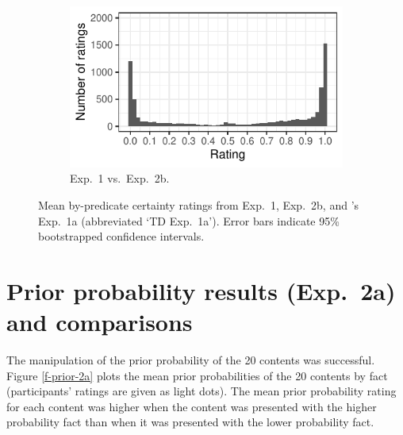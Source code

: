 \documentclass[11pt,fleqn]{article}
\newcommand{\6}{\mbox{$[\hspace*{-.6mm}[$}}
\newcommand{\9}{\mbox{$]\hspace*{-.6mm}]$}}
\newcommand{\citepos}[1]{\citeauthor{#1}'s \citeyear{#1}}
\begin{document}
\begin{figure}[h!]
\begin{subfigure}{.33\textwidth}
\includegraphics[width=\textwidth]{../../results/2-veridicality2/graphs/bunching}
\caption{Exp.~1 vs.\ Exp.~2b.}
\label{f-projcomp3}
\end{subfigure}
\caption{Mean by-predicate certainty ratings from Exp.~1, Exp.~2b, and \citepos{tonhauser-degen-factive} Exp.~1a (abbreviated `TD Exp.~1a'). Error bars indicate 95\% bootstrapped confidence intervals.}
\label{f-projection-comparisons}
\end{figure}

\section{Prior probability results (Exp.~2a) and comparisons}\label{a-exp2}

The manipulation of the prior probability of the 20 contents was successful. Figure \ref{f-prior-2a} plots the mean prior probabilities of the 20 contents by fact (participants' ratings are given as light dots). The mean prior probability rating for each content was higher when the content was presented with the higher probability fact than when it was presented with the lower probability fact.
\end{document}

